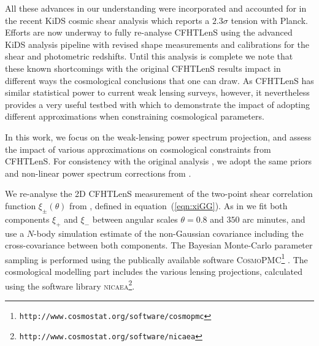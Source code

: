 %
All these advances in our understanding were incorporated and accounted for in
the recent KiDS cosmic shear analysis \citep{KiDS-450} which reports a $2.3
\sigma$ tension with Planck.  Efforts are now underway to fully re-analyse
CFHTLenS using the advanced KiDS analysis pipeline with revised shape
measurements and calibrations for the shear and photometric redshifts. Until
this analysis is complete we note that these known shortcomings with the
original CFHTLenS results impact in different ways the cosmological conclusions
that one can draw. As CFHTLenS has similar statistical power
to current weak lensing surveys, however, it nevertheless provides a very
useful testbed with which to demonstrate the impact of adopting different
approximations when constraining cosmological parameters.


In this work, we focus on the weak-lensing power spectrum projection, and
assess the impact of various approximations on cosmological constraints from
CFHTLenS. For consistency with the original analysis
\citep{CFHTLenS-2pt-notomo}, we adopt the same priors and non-linear power
spectrum corrections from \cite{2003MNRAS.341.1311S}.

We re-analyse the 2D CFHTLenS measurement of the two-point shear correlation
function $\xi_\pm(\theta)$ from \cite{CFHTLenS-2pt-notomo}, defined in
equation~(\ref{eqn:xiGG}). As in \cite{CFHTLenS-2pt-notomo} we fit both components
$\xi_+$ and $\xi_-$ between angular scales $\theta = 0.8$ and $350$ arc
minutes, and use a $N$-body simulation estimate of the non-Gaussian covariance
including the cross-covariance between both components. The Bayesian
Monte-Carlo parameter sampling is performed using the publically available
software \textsc{CosmoPMC}\footnote{\texttt{http://www.cosmostat.org/software/cosmopmc}}
\citep{WK09,KWR10}. The cosmological modelling part includes the various
lensing projections, calculated using the software library
\textsc{nicaea}\footnote{\texttt{http://www.cosmostat.org/software/nicaea}}.



